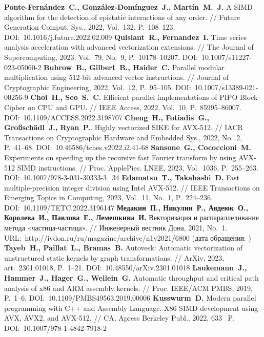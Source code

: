\begin{thebibliography}{99}
\textbf{Ponte-Fern{\'a}ndez~C., Gonz{\'a}lez-Dom{\'i}nguez~J., Mart{\'i}n~M.~J.} A SIMD algorithm for the detection of epistatic interactions of any order. // Future Generation Comput. Sys., 2022, Vol.~132, P.~108–123. DOI:~10.1016/j.future.2022.02.009
\textbf{Quislant~R., Fernandez~I.} Time series analysis acceleration with advanced vectorization extensions. // The Journal of Supercomputing, 2023, Vol.~79, No.~9, P.~10178–10207. DOI:~10.1007/s11227-023-05060-2
\textbf{Buhrow~B., Gilbert~B., Haider~C.} Parallel modular multiplication using 512-bit advanced vector instructions. // Journal of Cryptographic Engineering, 2022, Vol.~12, P.~95–105. DOI:~10.1007/s13389-021-00256-9
\textbf{Choi~H., Seo~S.~C.} Efficient parallel implementations of PIPO Block Cipher on CPU and GPU. // IEEE Access, 2022, Vol.~10, P.~85995–86007. DOI:~10.1109/ACCESS.2022.3198707
\textbf{Cheng~H., Fotiadis~G., Gro{\ss}sch{\"a}dl~J., Ryan~P.}. Highly vectorized SIKE for AVX-512. // IACR Transactions on Cryptographic Hardware and Embedded Sys., 2022, No.~2, P.~41–68. DOI:~10.46586/tches.v2022.i2.41-68
\textbf{Sansone~G., Cococcioni~M.} Experiments on speeding up the recursive fast Fourier transform by using AVX-512 SIMD instructions. // Proc. ApplePies. LNEE, 2023, Vol.~1036, P.~255–263. DOI:~10.1007/978-3-031-30333-3\_34
\textbf{Edamatsu~T., Takahashi~D.} Fast multiple-precision integer division using Intel AVX-512. // IEEE Transactions on Emerging Topics in Computing, 2023, Vol.~11, No.~1, P.~224–236. DOI:~10.1109/TETC.2022.3196147
\textbf{Медакин~П., Никулин~Р., Авдеюк~О., Королева~И., Павлова~Е., Лемешкина~И.} Векторизация и распараллеливание метода «частица-частица». // Инженерный вестник Дона, 2021, No.~1. URL:~http://ivdon.ru/ru/magazine/archive/n1y2021/6800 (дата обращения: \StrDate)
\textbf{Tayeb~H., Paillat~L., Bramas~B.} Autovesk: Automatic vectorization of unstructured static kernels by graph transformations. // ArXiv, 2023, art.~2301.01018, P.~1–21. DOI:~10.48550/arXiv.2301.01018
\textbf{Laukemann~J., Hammer~J., Hager~G., Wellein~G.} Automatic throughput and critical path analysis of x86 and ARM assembly kernels. // Proc. IEEE/ACM PMBS, 2019, P.~1–6. DOI:~10.1109/PMBS49563.2019.00006
\textbf{Kusswurm~D.} Modern parallel programming with C++ and Assembly Language. X86 SIMD development using AVX, AVX2, and AVX-512. // CA, Apress Berkeley Publ., 2022, 633~ P. DOI:~10.1007/978-1-4842-7918-2


\end{thebibliography}
